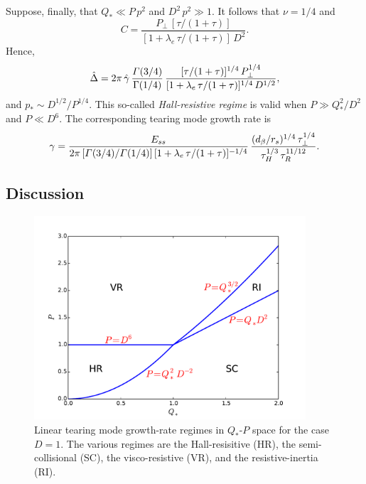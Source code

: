 \documentclass[notitlepage,12pt]{article}
\begin{document}
Suppose, finally, that $Q_\ast \ll P\,p^2$ and $D^2\,p^2\gg 1$. It follows that $\nu=1/4$ and
\begin{equation}
C = \frac{P_\perp\,[\tau/(1+\tau)]}{[1+\lambda_e\,\tau/(1+\tau)]\,D^2}.
\end{equation}
Hence,
\begin{equation} 
\hat{\Delta} = 2\pi\,\hat{\gamma}\,\frac{{\mit\Gamma}(3/4)}{\Gamma(1/4)}\,\frac{[\tau/(1+\tau)]^{1/4}\,P_\perp^{1/4}}{[1+\lambda_e\,\tau/(1+\tau)]^{1/4}\,D^{1/2}},
\end{equation}
and $p_\ast \sim D^{1/2}/P^{1/4}$. This so-called {\em Hall-resistive regime}\/ is valid when $P\gg Q_\ast^2/D^2$ and
$P\ll D^6$. The corresponding tearing mode growth rate is 
\begin{equation}
\gamma= \frac{E_{ss}}{2\pi\,[{\mit\Gamma}(3/4)/{\mit\Gamma}(1/4)]\,[1+\lambda_e\,\tau/(1+\tau)]^{-1/4}}\,\frac{(d_\beta/r_s)^{1/4}\,\tau_\perp^{1/4}}{\tau_H^{1/3}\,\tau_R^{11/12}}.
\end{equation}

\subsection{Discussion}

\begin{figure}
\centerline{\includegraphics[width=0.9\textwidth]{RegimeIII.pdf}}
\caption{Linear tearing mode growth-rate regimes  in $Q_\ast$-$P$ space for the case $D=1$. The various regimes are
the Hall-resisitive (HR), the semi-collisional (SC),  the visco-resistive (VR), and the resistive-inertia (RI).}\label{f3}
\end{figure}
\end{document}
